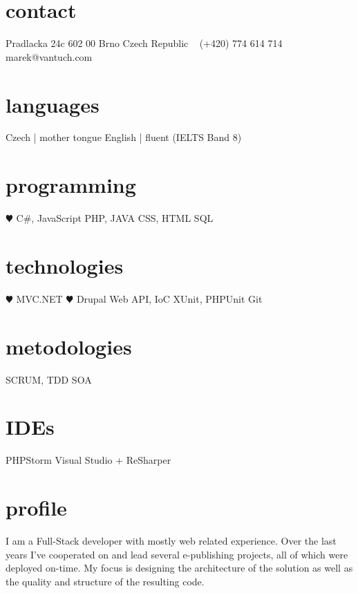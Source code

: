 \documentclass[]{friggeri-cv} %
\begin{document}


\begin{aside} %
\section{contact}
Pradlacka 24c
602 00 Brno
Czech Republic
~
(+420) 774 614 714
~
marek@vantuch.com
\section{languages}
Czech | mother tongue
English | fluent
(IELTS Band 8)
\section{programming}
{\color{red} $\varheartsuit$} C\#, JavaScript
PHP, JAVA
CSS, HTML
SQL
\section{technologies}
{\color{red} $\varheartsuit$} MVC.NET {\color{red} $\varheartsuit$} Drupal
Web API, IoC
XUnit, PHPUnit
Git
\section{metodologies}
SCRUM, TDD
SOA
\section{IDEs}
PHPStorm
Visual Studio + ReSharper
\end{aside}

\section{profile}
I am a Full-Stack developer with mostly web related experience.
Over the last years I've cooperated on and lead several e-publishing projects, all of which were deployed on-time.
My focus is designing the architecture of the solution as well as the quality and structure of the resulting code.
\end{document}
